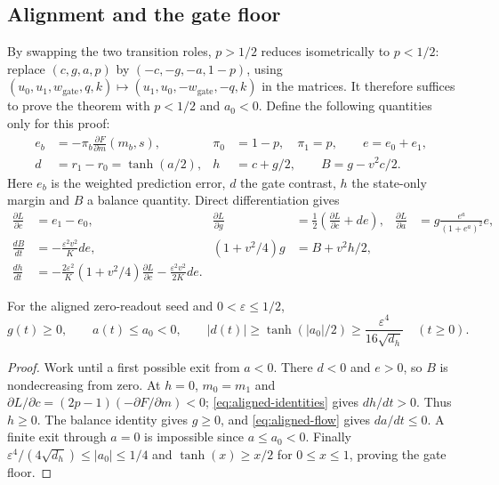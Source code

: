 \subsection{Alignment and the gate floor}
By swapping the two transition roles, $p>1/2$ reduces isometrically to
$p<1/2$: replace $(c,g,a,p)$ by $(-c,-g,-a,1-p)$, using
$(u_0,u_1,w_{\mathrm{gate}},q,k)\mapsto(u_1,u_0,-w_{\mathrm{gate}},-q,k)$ in the matrices.
It therefore suffices to prove the theorem with $p<1/2$ and $a_0<0$.
Define the following quantities only for this proof:
\[
\begin{aligned}
 e_b&=-\pi_b\frac{\partial F}{\partial m}(m_b,s),
 &\pi_0&=1-p,\quad\pi_1=p,\qquad e=e_0+e_1,\\
 d&=r_1-r_0=\tanh(a/2),
 &h&=c+g/2,\qquad B=g-v^2c/2.
\end{aligned}
\]
Here $e_b$ is the weighted prediction error, $d$ the gate contrast, $h$ the
state-only margin and $B$ a balance quantity. Direct differentiation gives
\begin{equation}
\begin{aligned}
 \frac{\partial L}{\partial c}&=e_1-e_0,&
 \frac{\partial L}{\partial g}&=\frac12\left(\frac{\partial L}{\partial c}+de\right),&
 \frac{\partial L}{\partial a}&=g\frac{e^a}{(1+e^a)^2}e,\\
 \frac{dB}{dt}&=-\frac{\varepsilon^2v^2}{K}de,&
 (1+v^2/4)g&=B+v^2h/2,\\
 \frac{dh}{dt}&=-\frac{2\varepsilon^2}{K}(1+v^2/4)\frac{\partial L}{\partial c}
                -\frac{\varepsilon^2v^2}{2K}de.
\end{aligned}
\label{eq:aligned-identities}
\end{equation}

\begin{lemma}
\label{lem:aligned-invariant}
For the aligned zero-readout seed and $0<\varepsilon\le1/2$,
\[
 g(t)\ge0,\qquad a(t)\le a_0<0,\qquad
 |d(t)|\ge\tanh(|a_0|/2)\ge\frac{\varepsilon^4}{16\sqrt{d_h}}
 \quad(t\ge0).
\]
\end{lemma}
\begin{proof}
Work until a first possible exit from $a<0$. There $d<0$ and $e>0$,
so $B$ is nondecreasing from zero. At $h=0$, $m_0=m_1$ and
$\partial L/\partial c=(2p-1)(-\partial F/\partial m)<0$;
\cref{eq:aligned-identities} gives $dh/dt>0$. Thus $h\ge0$.
The balance identity gives $g\ge0$, and \cref{eq:aligned-flow} gives $da/dt\le0$.
A finite exit through $a=0$ is impossible since $a\le a_0<0$.
Finally $\varepsilon^4/(4\sqrt{d_h})\le|a_0|\le1/4$ and
$\tanh(x)\ge x/2$ for $0\le x\le1$, proving the gate floor.
\end{proof}

